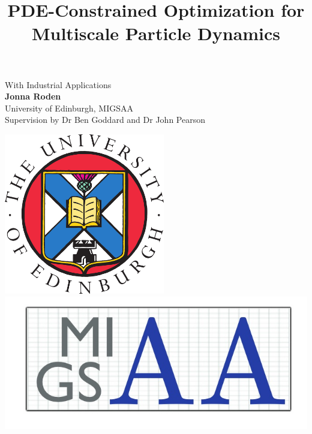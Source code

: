 \documentclass[a0,portrait]{a0poster}
\begin{document}
\thispagestyle{empty}
\title{\veryHuge \color{NavyBlue} \textbf{PDE-Constrained Optimization for Multiscale Particle Dynamics} \color{Black}} %
\author{}
\date{}
\maketitle
\vspace{-2cm}
\begin{minipage}[b]{0.65\linewidth}
\Huge{With Industrial Applications}\\[2cm] %
\huge \textbf{Jonna Roden}\\[0.5cm] %
\huge University of Edinburgh, MIGSAA\\[0.4cm] %
\Large {Supervision by Dr Ben Goddard and Dr John Pearson} \\
\end{minipage}
\begin{minipage}[b]{0.35\linewidth}
	\vspace{-5cm}
\includegraphics[width=7cm]{EdinburghUni.png} \ \ \ \ \ \ \ \ \ \ 
\includegraphics[width=15cm]{MIGSAA.jpg}\\
\end{minipage}
\end{document}
